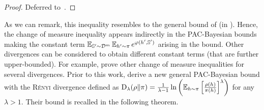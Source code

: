 \begin{noaddcontents}\begin{proof}
Deferred to~.
\end{proof}\end{noaddcontents}

As we can remark, this inequality resembles to the general bound of \citet{GermainLacasseLavioletteMarchand2009} (in ).
Hence, the change of measure inequality appears indirectly in the PAC-Bayesian bounds making the constant term $\operatorname*{\mathbb{E}}_{\mathbb{S}'\sim\mathcal{D}^m}\operatorname*{\mathbb{E}}_{h'\sim\pi}e^{\varphi(h',\mathbb{S}')}$ arising in the bound.
Other divergences can be considered to obtain different constant terms (that are further upper-bounded).
For example, \citet{OhnishiHonorio2021} prove other change of measure inequalities for several divergences.
Prior to this work, \citet{BeginGermainLavioletteRoy2016} derive a new general PAC-Bayesian bound with the \textsc{Rényi} divergence defined as $\operatorname{D}_{\lambda}(\rho\|\pi) = \frac{1}{\lambda{-}1}\ln\left(\operatorname*{\mathbb{E}}_{h\sim\pi}\left[\frac{\rho(h)}{\pi(h)}\right]^\lambda\right)$ for any $\lambda> 1$.
Their bound is recalled in the following theorem.

